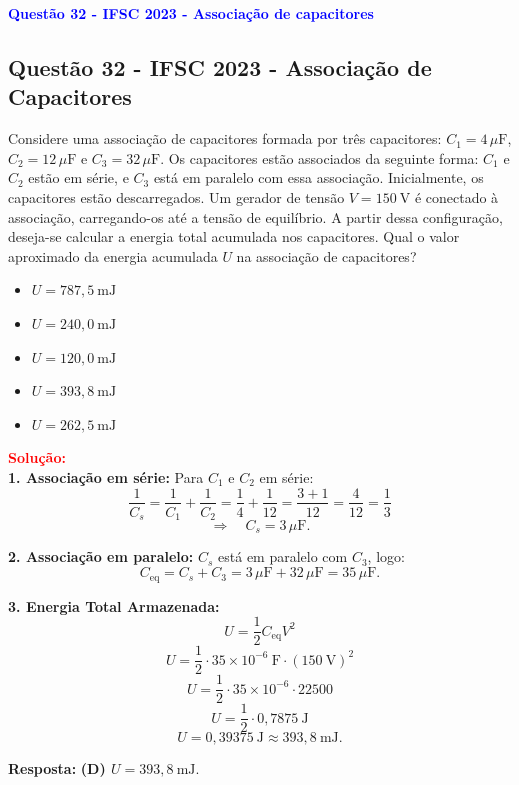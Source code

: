 \begin{flushleft}
\textbf{\textcolor{blue}{\Large Quest\~ao 32 - IFSC 2023 - Associação de capacitores}}\\
\noindent

\subsection{Quest\~ao 32 - IFSC 2023 - Associação de Capacitores}
Considere uma associa\c{c}\~ao de capacitores formada por tr\^es capacitores: \(C_1 = 4\,\mu\text{F}\), \(C_2 = 12\,\mu\text{F}\) e \(C_3 = 32\,\mu\text{F}\). Os capacitores est\~ao associados da seguinte forma: \(C_1\) e \(C_2\) est\~ao em s\'erie, e \(C_3\) est\'a em paralelo com essa associa\c{c}\~ao. Inicialmente, os capacitores est\~ao descarregados. Um gerador de tens\~ao \(V = 150\ \text{V}\) \'e conectado \`a associa\c{c}\~ao, carregando-os at\'e a tens\~ao de equil\'ibrio. A partir dessa configura\c{c}\~ao, deseja-se calcular a energia total acumulada nos capacitores. Qual o valor aproximado da energia acumulada \(U\) na associa\c{c}\~ao de capacitores?

\begin{itemize}
\item[(A)] \(U = 787{,}5\ \text{mJ}\)
\item[(B)] \(U = 240{,}0\ \text{mJ}\)
\item[(C)] \(U = 120{,}0\ \text{mJ}\)
\item[(D)] \(U = 393{,}8\ \text{mJ}\)
\item[(E)] \(U = 262{,}5\ \text{mJ}\)
\end{itemize}

\vspace{0.5cm}

\textcolor{red}{\textbf{Solução:}}\\

\textbf{1. Associação em série:} Para \(C_1\) e \(C_2\) em série:
\[
\frac{1}{C_s} = \frac{1}{C_1} + \frac{1}{C_2} 
= \frac{1}{4} + \frac{1}{12} 
= \frac{3 + 1}{12} 
= \frac{4}{12} 
= \frac{1}{3}
\]
\[
\Rightarrow\quad C_s = 3\,\mu\text{F}.
\]

\textbf{2. Associação em paralelo:} \(C_s\) está em paralelo com \(C_3\), logo:
\[
C_{\text{eq}} = C_s + C_3 = 3\,\mu\text{F} + 32\,\mu\text{F} = 35\,\mu\text{F}.
\]

\textbf{3. Energia Total Armazenada:}
\[
\boxed{
U = \frac{1}{2} C_{\text{eq}} V^2
}
\]
\[
U = \frac{1}{2} \cdot 35 \times 10^{-6}\ \text{F} \cdot (150\ \text{V})^2
\]
\[
U = \frac{1}{2} \cdot 35 \times 10^{-6} \cdot 22500
\]
\[
U = \frac{1}{2} \cdot 0{,}7875\ \text{J}
\]
\[
U = 0{,}39375\ \text{J} \approx 393{,}8\ \text{mJ}.
\]

\textbf{Resposta:} \colorbox{green!50}{\textbf{(D) \(U = 393{,}8\ \text{mJ}\)}}.

\end{flushleft}



